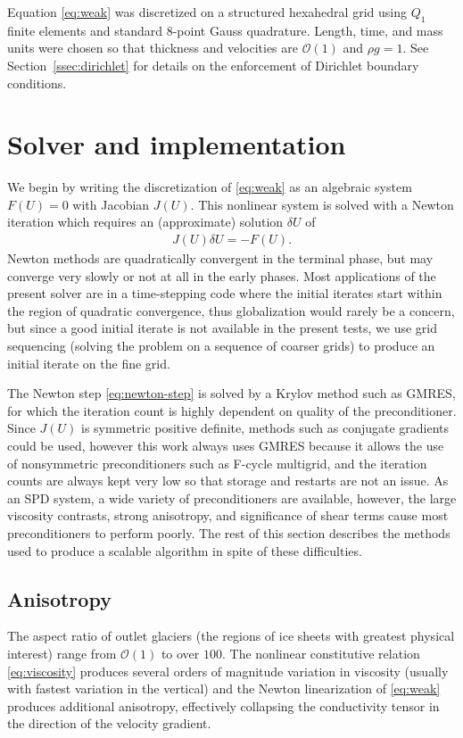 \documentclass[10pt,letterpaper,oneeqnum,final]{siamltex}
\newcommand{\bigO}{{\mathcal{O}}}
\begin{document}
Equation \eqref{eq:weak} was discretized on a structured hexahedral grid using $Q_1$ finite elements
and standard 8-point Gauss quadrature.  Length, time, and mass units were chosen so that thickness
and velocities are $\bigO(1)$ and $\rho g = 1$.  See Section~\ref{ssec:dirichlet} for details on the
enforcement of Dirichlet boundary conditions.

\section{Solver and implementation}\label{sec:solver}
We begin by writing the discretization of \eqref{eq:weak} as an algebraic system $F(U) = 0$ with
Jacobian $J(U)$.  This nonlinear system is solved with a Newton iteration which requires an
(approximate) solution $\delta U$ of
\begin{align}\label{eq:newton-step}
  J(U)\delta U = -F(U) .
\end{align}
Newton methods are quadratically convergent in the terminal phase, but may converge very slowly or
not at all in the early phases.  Most applications of the present solver are in a time-stepping code
where the initial iterates start within the region of quadratic convergence, thus globalization
would rarely be a concern, but since a good initial iterate is not available in the present tests,
we use grid sequencing (solving the problem on a sequence of coarser grids) to produce an initial
iterate on the fine grid.

The Newton step \eqref{eq:newton-step} is solved by a Krylov method such as GMRES, for which the
iteration count is highly dependent on quality of the preconditioner.  Since $J(U)$ is symmetric
positive definite, methods such as conjugate gradients could be used, however this work always uses
GMRES because it allows the use of nonsymmetric preconditioners such as F-cycle multigrid, and the
iteration counts are always kept very low so that storage and restarts are not an issue.  As an SPD
system, a wide variety of preconditioners are available, however, the large viscosity contrasts,
strong anisotropy, and significance of shear terms cause most preconditioners to perform poorly.
The rest of this section describes the methods used to produce a scalable algorithm in spite of
these difficulties.

\subsection{Anisotropy}
The aspect ratio of outlet glaciers (the regions of ice sheets with greatest physical interest)
range from $\bigO(1)$ to over $100$.  The nonlinear constitutive relation \eqref{eq:viscosity}
produces several orders of magnitude variation in viscosity (usually with fastest variation in the
vertical) and the Newton linearization of \eqref{eq:weak} produces additional anisotropy,
effectively collapsing the conductivity tensor in the direction of the velocity gradient.
\end{document}
